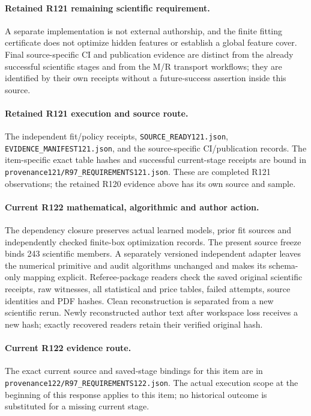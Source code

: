 \paragraph{Retained R121 remaining scientific requirement.}
A separate implementation is not external authorship, and the finite fitting certificate does not optimize hidden features or establish a global feature cover. Final source-specific CI and publication evidence are distinct from the already successful scientific stages and from the M/R transport workflows; they are identified by their own receipts without a future-success assertion inside this source.

\paragraph{Retained R121 execution and source route.}
The independent fit/policy receipts, \nolinkurl{SOURCE_READY121.json}, \nolinkurl{EVIDENCE_MANIFEST121.json}, and the source-specific CI/publication records.
The item-specific exact table hashes and successful current-stage receipts are bound in \nolinkurl{provenance121/R97_REQUIREMENTS121.json}. These are completed R121 observations; the retained R120 evidence above has its own source and sample.
\paragraph{Current R122 mathematical, algorithmic and author action.}
The dependency closure preserves actual learned models, prior fit sources and independently checked finite-box optimization records. The present source freeze binds 243 scientific members. A separately versioned independent adapter leaves the numerical primitive and audit algorithms unchanged and makes its schema-only mapping explicit. Referee-package readers check the saved original scientific receipts, raw witnesses, all statistical and price tables, failed attempts, source identities and PDF hashes. Clean reconstruction is separated from a new scientific rerun. Newly reconstructed author text after workspace loss receives a new hash; exactly recovered readers retain their verified original hash.
\paragraph{Current R122 evidence route.}
The exact current source and saved-stage bindings for this item are in \nolinkurl{provenance122/R97_REQUIREMENTS122.json}. The actual execution scope at the beginning of this response applies to this item; no historical outcome is substituted for a missing current stage.
